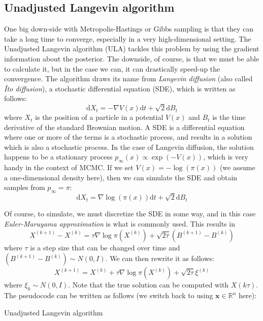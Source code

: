 \documentclass[12pt]{memoir}
\newcommand{\mb}{\mathbf}
\newcommand{\ti}{\textit}
\begin{document}
\subsection{Unadjusted Langevin algorithm}
One big down-side with Metropolis-Hastings or Gibbs sampling is that they can take a long time to converge, especially in a very high-dimensional setting. The Unadjusted Langevin algorithm (ULA) tackles this problem by using the gradient information about the posterior. The downside, of course, is that we must be able to calculate it, but in the case we can, it can drastically speed-up the convergence. The algorithm draws its name from \ti{Langevin diffusion} (also called \ti{Îto diffusion}), a stochastic differential equation (SDE), which is written as follows:
\begin{equation}
    \mathrm{d}X_t = -\nabla V(x)\mathrm{d}t + \sqrt{2}\mathrm{d}B_t
\end{equation}
where $X_t$ is the position of a particle in a potential $V(x)$ and $B_t$ is the time derivative of the standard Brownian motion. A SDE is a differential equation where one or more of the terms is a stochastic process, and results in a solution which is also a stochastic process. In the case of Langevin diffusion, the solution happens to be a stationary process $p_{\infty}(x) \propto \exp(-V(x))$, which is very handy in the context of MCMC. If we set $V(x) = -\log(\pi(x))$ (we assume a one-dimensional density here), then we can simulate the SDE and obtain samples from $p_\infty = \pi$:
\begin{equation}    
    \mathrm{d}X_t = \nabla \log(\pi(x))\mathrm{d}t + \sqrt{2}\mathrm{d}B_t
\end{equation}

Of course, to simulate, we must discretize the SDE in some way, and in this case \textit{Euler-Maruyama approximation} is what is commonly used. This results in
\begin{equation}
    X^{(k+1)} - X^{(k)} = \tau \nabla \log\pi(X^{(k)}) + \sqrt{2\tau}(B^{(k+1)} - B^{(k)})
\end{equation}
where $\tau$ is a step size that can be changed over time and $(B^{(k+1)} - B^{(k)}) \sim N(0, I)$. We can then rewrite it as follows:
\begin{equation}
    X^{(k+1)} = X^{(k)} + \tau \nabla \log\pi(X^{(k)}) + \sqrt{2\tau}\xi^{(k)}
\end{equation}
where $\xi_k \sim N(0, I)$. Note that the true solution can be computed with $X(k\tau)$. The pseudocode can be written as follows (we switch back to using $\mb x \in \mathbb{R}^n$ here):\medbreak
\begin{algorithm}[H]
    \DontPrintSemicolon

    \Input{$\mb x^{(0)}, K, B, \tau_{1:K}$}
    \Output{$\mb x^{(B+1)}, \mb x^{(B+2)}, \dots, \mb x^{(K)}$}
    \For{$k\gets 1:K$}{ 
        $\boldsymbol{\xi}^{(k)} \sim N(0, I)$\;
        $\mb x^{(k+1)} = \mb x^{(k)} + \tau_k \nabla \log\pi(\mb x^{(k)}) + \sqrt{2\tau_k}\boldsymbol{\xi}^{(k)}$\;
    }
    \caption{Unadjusted Langevin algorithm}
\end{algorithm}\medbreak
\end{document}
